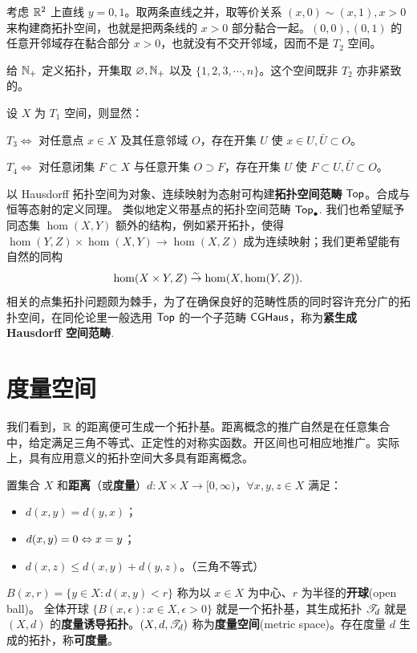 \begin{example}
    考虑 $\mathbb{R}^2$ 上直线 $y=0,1$。取两条直线之并，取等价关系 $(x,0) \sim(x,1),x>0$ 来构建商拓扑空间，也就是把两条线的 $x>0$ 部分黏合一起。$(0,0),(0,1)$ 的任意开邻域存在黏合部分 $x>0$，也就没有不交开邻域，因而不是 $T_2$ 空间。
\end{example}

\begin{example}
    给 $\mathbb{N}_+$ 定义拓扑，开集取 $\varnothing,\mathbb{N}_+$ 以及 $\{1,2,3,\cdots,n\}$。这个空间既非 $T_2$ 亦非紧致的。
\end{example}

\begin{theorem}[收缩(shrink)]
    设 $X$ 为 $T_1$ 空间，则显然：

    $T_3\iff$ 对任意点 $x\in X$ 及其任意邻域 $O$，存在开集 $U$ 使
$x\in U, \bar U \subset O$。

$T_4\iff$ 对任意闭集 $F\subset X$ 与任意开集 $O\supset F$，存在开集 $U$ 使 $F\subset U, \bar U \subset O$。
\end{theorem}

以 Hausdorff 拓扑空间为对象、连续映射为态射可构建\textbf{拓扑空间范畴} $\mathsf{Top}$。合成与恒等态射的定义同理。
类似地定义带基点的拓扑空间范畴 $\mathsf{Top}_\bullet$. 我们也希望赋予同态集 $\hom(X,Y)$ 额外的结构，例如紧开拓扑，使得 $\hom(Y, Z) \times \hom(X, Y) \to \hom(X, Z)$ 成为连续映射；我们更希望能有自然的同构
\[ \hom(X \times Y, Z) \stackrel{\sim}{\rightarrow} \hom(X, \hom(Y, Z)). \]
相关的点集拓扑问题颇为棘手，为了在确保良好的范畴性质的同时容许充分广的拓扑空间，在同伦论里一般选用 $\mathsf{Top}$ 的一个子范畴 $\mathsf{CGHaus}$，称为\textbf{紧生成 Hausdorff 空间范畴}.

\section{度量空间}

我们看到，$\mathbb{R}$ 的距离便可生成一个拓扑基。距离概念的推广自然是在任意集合中，给定满足三角不等式、正定性的对称实函数。开区间也可相应地推广。实际上，具有应用意义的拓扑空间大多具有距离概念。

\begin{definition}\label{def:metric_topo}
    置集合 $X$ 和\textbf{距离}（或\textbf{度量}）$d: X \times X \to [0,\infty)$，$\forall x,y,z\in X$ 满足：
    \begin{itemize}
        \item $d(x,y)=d(y,x)$；
        \item $d(x,y) = 0\Leftrightarrow x=y$；
        \item $d(x,z) \leqslant d(x,y)+d(y,z)$。（三角不等式）
    \end{itemize}
    $B(x,r)=\{y \in X: d(x, y)<r\}$ 称为以 $x \in X$ 为中心、$r$ 为半径的\textbf{开球}(open ball)。
    全体开球 $\{B(x,\epsilon):x\in X,\epsilon >0\}$ 就是一个拓扑基，其生成拓扑 $\mathscr T_d$ 就是 $(X,d)$ 的\textbf{度量诱导拓扑}。$(X,d,\mathscr T_d)$ 称为\textbf{度量空间}(metric space)。存在度量 $d$ 生成的拓扑，称\textbf{可度量}。
\end{definition}

